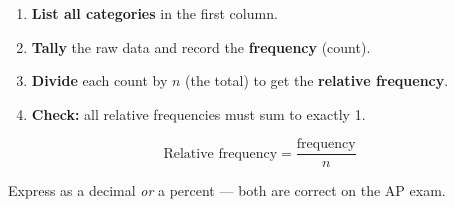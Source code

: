 \documentclass[aspectratio=169, 11pt]{beamer}
\begin{document}
{
\begin{frame}[t, plain]
  \hspace{0.55cm}%
  \begin{minipage}{0.9\textwidth}
    \small

    \begin{enumerate}
      \setlength{\itemsep}{0.55em}
      \item \textbf{List all categories} in the first column.
      \item \textbf{Tally} the raw data and record the \textbf{frequency} (count).
      \item \textbf{Divide} each count by $n$ (the total) to get the
            \textbf{relative frequency}.
      \item \textbf{Check:} all relative frequencies must sum to exactly 1.
    \end{enumerate}

    \vspace{0.5cm}
    \[
      \text{Relative frequency} = \frac{\text{frequency}}{n}
    \]

    \vspace{0.3cm}
    {\color{navy}\small
      Express as a decimal \textit{or} a percent --- both are correct on the AP exam.}
  \end{minipage}
\end{frame}
}
\end{document}
